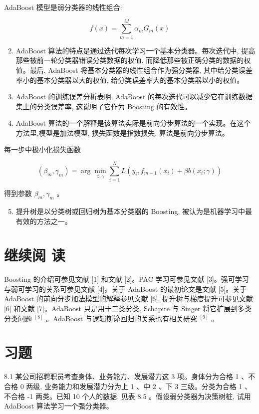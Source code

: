 \documentclass[10pt]{article}
\begin{document}
AdaBoost 模型是弱分类器的线性组合:

$$
f(x)=\sum_{m=1}^{M} \alpha_{m} G_{m}(x)
$$

\begin{enumerate}
  \setcounter{enumi}{1}
  \item AdaBoost 算法的特点是通过迭代每次学习一个基本分类器。每次迭代中, 提高那些被前一轮分类器错误分类数据的权值, 而降低那些被正确分类的数据的权值。最后, AdaBoost 将基本分类器的线性组合作为强分类器, 其中给分类误差率小的基本分类器以大的权值, 给分类误差率大的基本分类器以小的权值。

  \item AdaBoost 的训练误差分析表明, AdaBoost 的每次迭代可以减少它在训练数据集上的分类误差率, 这说明了它作为 Boosting 的有效性。

  \item AdaBoost 算法的一个解释是该算法实际是前向分步算法的一个实现。在这个方法里,模型是加法模型, 损失函数是指数损失, 算法是前向分步算法。

\end{enumerate}

每一步中极小化损失函数

$$
\left(\beta_{m}, \gamma_{m}\right)=\arg \min _{\beta, \gamma} \sum_{i=1}^{N} L\left(y_{i}, f_{m-1}\left(x_{i}\right)+\beta b\left(x_{i} ; \gamma\right)\right)
$$

得到参数 $\beta_{m}, \gamma_{m}$ 。

\begin{enumerate}
  \setcounter{enumi}{4}
  \item 提升树是以分类树或回归树为基本分类器的 Boosting, 被认为是机器学习中最有效的方法之一。
\end{enumerate}

\section*{继续阅 读}
Boosting 的介绍可参见文献 [1] 和文献 [2]。PAC 学习可参见文献 [3]。强可学习与弱可学习的关系可参见文献 [4]。关于 AdaBoost 的最初论文是文献 [5]。关于 AdaBoost 的前向分步加法模型的解释参见文献 [6], 提升树与梯度提升可参见文献 [6] 和文献 [7]。AdaBoost 只是用于二类分类, Schapire 与 Singer 将它扩展到多类分类问题 ${ }^{[8]}$ 。AdaBoost 与逻辑斯谛回归的关系也有相关研究 ${ }^{[9]}$ 。

\section*{习题}
8.1 某公司招聘职员考查身体、业务能力、发展潜力这 3 项。身体分为合格 1 、不合格 0 两级, 业务能力和发展潜力分为上 1 、中 2 、下 3 三级。分类为合格 1 、不合格 -1 两类。已知 10 个人的数据, 见表 8.5 。假设弱分类器为决策树桩, 试用 AdaBoost 算法学习一个强分类器。
\end{document}
